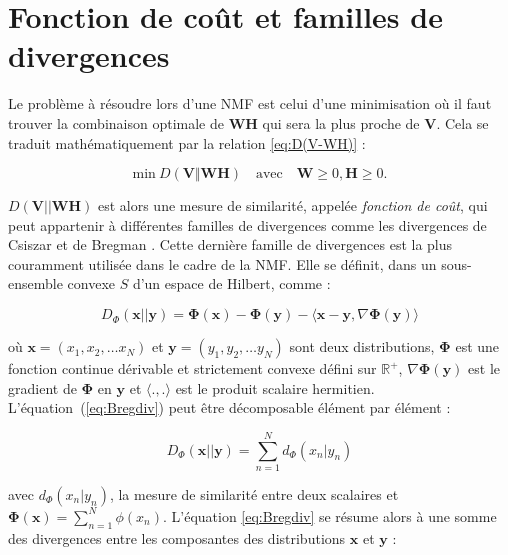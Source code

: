 \section{Fonction de coût et familles de divergences}

Le problème à résoudre lors d'une NMF est celui d'une minimisation où il faut trouver la combinaison optimale de $\mathbf{WH}$ qui sera la plus proche de $\mathbf{V}$. Cela se traduit mathématiquement par la relation \ref{eq:D(V-WH)} :

\begin{equation}\label{eq:D(V-WH)}
\text{min}~D\left(\textbf{V} \Vert \textbf{WH}\right) \quad \text{avec} \quad \mathbf{W} \geq 0, \mathbf{H} \geq 0.
\end{equation}

$D\left(\textbf{V} \vert\vert \textbf{WH}\right)$ est alors une mesure de similarité, appelée \textit{fonction de coût}, qui peut appartenir à différentes familles de divergences comme les divergences de Csiszar \cite{cichocki2006csiszar} et de Bregman \cite{bregman_relaxation_1967, dhillon_generalized_2005}. Cette dernière famille de divergences est la plus couramment utilisée dans le cadre de la NMF. Elle se définit, dans un sous-ensemble convexe $S$ d'un espace de Hilbert, comme :

\begin{equation}\label{eq:Bregdiv}
D_{\Phi}(\textbf{x}\vert\vert \textbf{y}) =
\mathbf{\Phi}(\mathbf{x}) - \mathbf{\Phi}(\mathbf{y}) -
\langle\mathbf{x}-\mathbf{y},\nabla\mathbf{\Phi}(\mathbf{y})\rangle
\end{equation}

où  $\mathbf{x} = (x_1, x_2, \dots x_N)$ et $\mathbf{y} = (y_1, y_2, \dots y_N)$ sont deux distributions, $\mathbf{\Phi}$ est une fonction continue dérivable et strictement convexe défini sur $\mathbb{R}^+$, $\nabla\mathbf{\Phi}(\mathbf{y})$ est le gradient de $\mathbf{\Phi}$ en $\mathbf{y}$ et $\langle .,.\rangle$ est le produit scalaire hermitien. L'équation~(\ref{eq:Bregdiv}) peut être décomposable élément par élément :

\begin{equation}
D_{\Phi}(\mathbf{x}\vert\vert \mathbf{y}) = \sum_{n=1}^N d_{\Phi}(x_n\vert y_n)
\end{equation}

avec $d_{\Phi}(x_n\vert y_n)$, la mesure de similarité entre deux scalaires et $\mathbf{\Phi(x)} = \sum_{n=1}^N \phi(x_n)$. L'équation \ref{eq:Bregdiv} se résume alors à une somme des divergences entre les composantes des distributions $\mathbf{x}$ et $\mathbf{y}$ :


